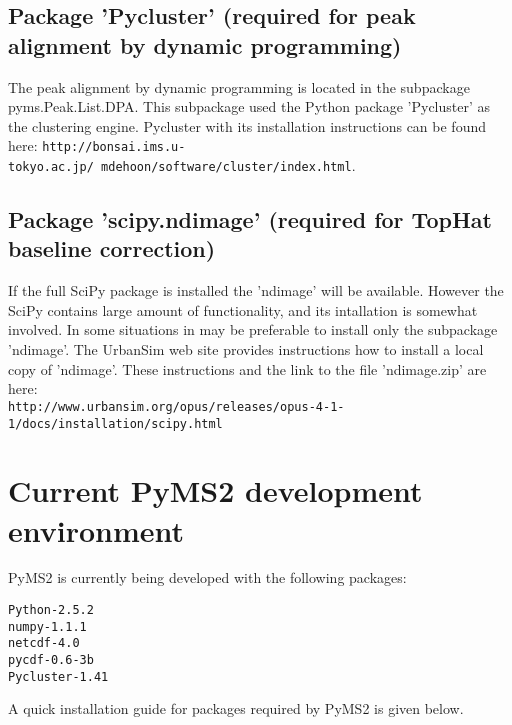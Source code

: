 \subsection{\label{subsec:pycluster}Package 'Pycluster' (required for peak
alignment by dynamic programming)}

The peak alignment by dynamic programming is located in the subpackage
pyms.Peak.List.DPA. This subpackage used the Python package 'Pycluster'
as the clustering engine. Pycluster with its installation instructions
can be found here:
{\tt http://bonsai.ims.u-tokyo.ac.jp/~mdehoon/software/cluster/index.html}.

\subsection{\label{subsec:scipy-ndmage}Package 'scipy.ndimage' (required
for TopHat baseline correction)}

If the full SciPy package is installed the 'ndimage' will be available. However
the SciPy contains large amount of functionality, and its intallation is
somewhat involved. In some situations in may be preferable to install only
the subpackage 'ndimage'. The UrbanSim web site \cite{urbansim} provides
instructions how to install a local copy of 'ndimage'. These instructions
and the link to the file 'ndimage.zip' are here:\\
{\tt http://www.urbansim.org/opus/releases/opus-4-1-1/docs/installation/scipy.html}

\section{Current PyMS2 development environment}

PyMS2 is currently being developed with the following packages:

\begin{verbatim}
Python-2.5.2
numpy-1.1.1
netcdf-4.0
pycdf-0.6-3b
Pycluster-1.41
\end{verbatim}

A quick installation guide for packages required by PyMS2 is given below.

